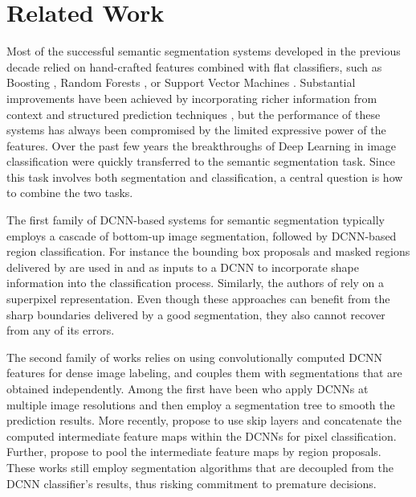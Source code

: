 \section{Related Work}
Most of the successful semantic segmentation systems developed in the previous decade relied on hand-crafted features 
combined with flat classifiers, such as Boosting \cite{TuB10,shotton2009textonboost}, Random Forests \cite{shotton2008semantic}, or Support Vector Machines \cite{FulkersonVS09}. Substantial improvements have been achieved
 by incorporating richer information from context
\cite{carreira2012semantic} 
and structured prediction techniques \cite{he2004multiscale,ladicky2009associative,carreira2012cpmc,krahenbuhl2011efficient}, but
the performance of these systems has always been compromised by the limited expressive power of the features.
Over the past few years the breakthroughs of Deep Learning in image classification were quickly transferred to the semantic 
segmentation task. Since this task involves both segmentation and classification, a central question is how to combine the two tasks. 

The first family of DCNN-based systems for semantic segmentation typically employs a cascade of
bottom-up image segmentation, followed by DCNN-based region classification.
For instance the bounding box proposals and masked regions delivered by
\cite{arbelaez2014multiscale, Uijlings13} are used in \cite{girshick2014rcnn}
and \cite{hariharan2014simultaneous}  as inputs to a DCNN to incorporate shape
information into the classification process. Similarly, the authors of
 \cite{mostajabi2014feedforward} rely on a superpixel representation.
Even though these approaches can benefit from the sharp boundaries delivered by a  good segmentation,
they also cannot recover from any of its errors. 


The second family of works relies on using convolutionally computed DCNN
features for dense image labeling, and couples them with segmentations that are obtained independently.
Among the first have been
\cite{farabet2013learning} who apply DCNNs at multiple image resolutions and
then employ a segmentation tree to smooth the prediction results. More recently,
\cite{hariharan2014hypercolumns} propose to use skip layers and concatenate the computed
intermediate feature maps within the DCNNs for pixel classification. Further, \cite{dai2014convolutional}
propose to pool the intermediate feature maps by region proposals. These works
still employ segmentation algorithms that are decoupled from the DCNN
classifier's results, thus risking commitment to premature decisions. 

